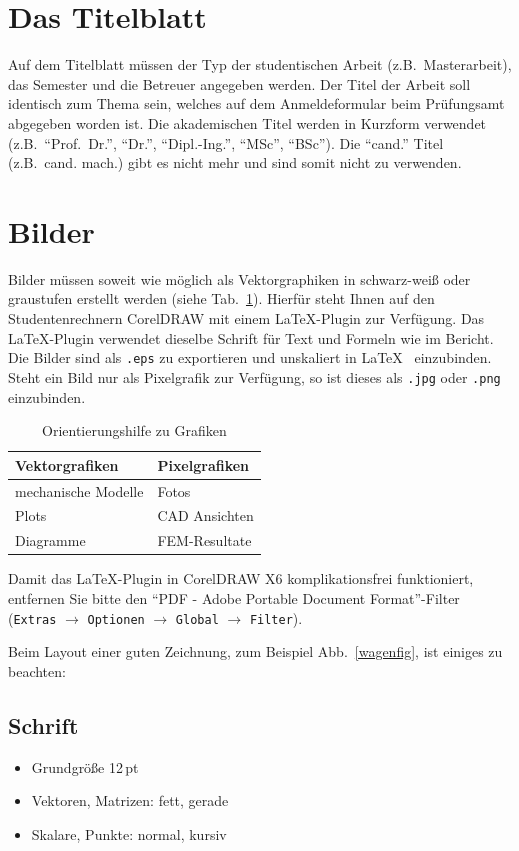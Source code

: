 \section{Das Titelblatt}
Auf dem Titelblatt müssen der Typ der studentischen Arbeit (z.B.\ Masterarbeit), das Semester und die Betreuer angegeben werden. Der Titel der Arbeit soll identisch zum Thema sein, welches auf dem Anmeldeformular beim Prüfungsamt abgegeben worden ist. Die akademischen Titel werden in Kurzform verwendet (z.B.\ ``Prof.~Dr.'', ``Dr.'', ``Dipl.-Ing.'', ``MSc'', ``BSc''). Die ``cand.'' Titel (z.B.\ cand. mach.) gibt es nicht mehr und sind somit nicht zu verwenden.


\section{Bilder}
Bilder müssen soweit wie möglich als Vektorgraphiken in schwarz-weiß oder graustufen erstellt werden (siehe Tab.~\ref{tab:grafiken}). Hierfür steht Ihnen auf den Studentenrechnern CorelDRAW mit einem \LaTeX-Plugin zur Verfügung. Das \LaTeX-Plugin verwendet dieselbe Schrift für Text und Formeln wie im Bericht. Die Bilder sind als \verb".eps" zu exportieren und unskaliert in \LaTeX~ einzubinden. Steht ein Bild nur als Pixelgrafik zur Verfügung, so ist dieses als \verb".jpg" oder \verb".png" einzubinden.

\begin{table}[h] \centering
\begin{tabular}{ll}
\toprule
Vektorgrafiken & Pixelgrafiken \\
\midrule
mechanische Modelle & Fotos \\
Plots & CAD Ansichten \\
Diagramme & FEM-Resultate \\
\bottomrule
\end{tabular}
\caption{Orientierungshilfe zu Grafiken}\label{tab:grafiken}
\end{table}
Damit das \LaTeX-Plugin in CorelDRAW X6 komplikationsfrei funktioniert, entfernen Sie bitte den ``PDF - Adobe Portable Document Format''-Filter (\verb"Extras" $\rightarrow$ \verb"Optionen" $\rightarrow$ \verb"Global" $\rightarrow$ \verb"Filter").


Beim Layout einer guten Zeichnung, zum Beispiel Abb.~\ref{wagenfig}, ist einiges zu beachten:


\subsection*{Schrift}
\begin{itemize}
    \setlength\itemsep{\itemizeskip}
    \item Grundgröße 12\,pt
    \item Vektoren, Matrizen: fett, gerade
    \item Skalare, Punkte: normal, kursiv
\end{itemize}

